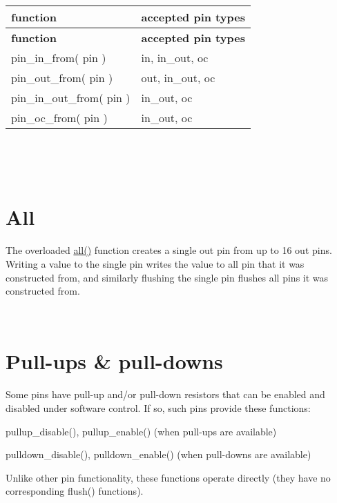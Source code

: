 \tabulinesep=1mm
\begin{longtabu} spread 0pt [c]{*{2}{|X[-1]}|}
\hline
\rowcolor{\tableheadbgcolor}\textbf{ function }&\textbf{ accepted pin types  }\\
\endfirsthead
\hline
\endfoot
\hline
\rowcolor{\tableheadbgcolor}\textbf{ function }&\textbf{ accepted pin types  }\\
\endhead
pin\+\_\+in\+\_\+from( pin ) &in, in\+\_\+out, oc \\
pin\+\_\+out\+\_\+from( pin ) &out, in\+\_\+out, oc \\
pin\+\_\+in\+\_\+out\+\_\+from( pin ) &in\+\_\+out, oc \\
pin\+\_\+oc\+\_\+from( pin ) &in\+\_\+out, oc \\
\end{longtabu}
~\newline



\begin{DoxyCodeInclude}
\end{DoxyCodeInclude}
~\newline
 

\hypertarget{pins_pin-all}{}\section{All}\label{pins_pin-all}
The overloaded \hyperlink{structxy_af0ac2823653fbb02e47de4315fb20a49}{all()} function creates a single out pin from up to 16 out pins. Writing a value to the single pin writes the value to all pin that it was constructed from, and similarly flushing the single pin flushes all pins it was constructed from.

~\newline
 

\hypertarget{pins_pin-pullups}{}\section{Pull-\/ups \& pull-\/downs}\label{pins_pin-pullups}
Some pins have pull-\/up and/or pull-\/down resistors that can be enabled and disabled under software control. If so, such pins provide these functions\+:
\begin{DoxyItemize}
\item pullup\+\_\+disable(), pullup\+\_\+enable() (when pull-\/ups are available)
\item pulldown\+\_\+disable(), pulldown\+\_\+enable() (when pull-\/downs are available)
\end{DoxyItemize}

Unlike other pin functionality, these functions operate directly (they have no corresponding flush() functions).

~\newline
 